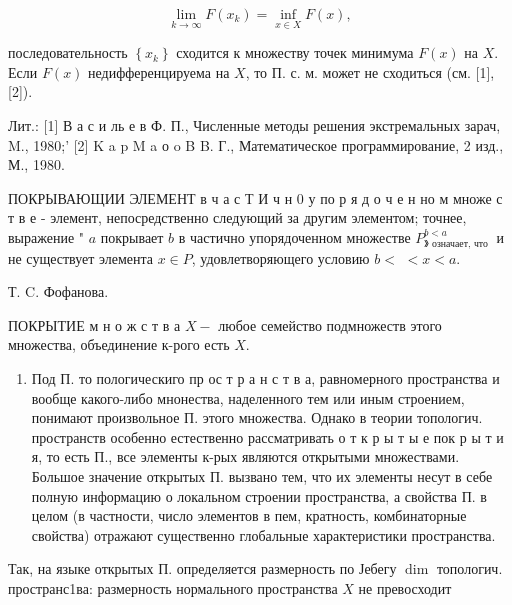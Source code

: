 \documentclass[10pt]{article}
\begin{document}
\[

\lim _{k \rightarrow \infty} F\left(x_{k}\right)=\inf _{x \in X} F(x),

\]



последовательность $\left\{x_{k}\right\}$ сходится к множеству точек минимума $F(x)$ на $X$. Если $F(x)$ недифференцируема на $X$, то П. с. м. может не сходиться (см. [1], [2]).



Лит.: [1] В а с и ль е в Ф. П., Численные методы решения экстремальных зарач, M., 1980;' [2] K a p M a о o B B. Г., Математическое программирование, 2 изд., М., 1980.



ПОКРЫВАЮЩИИ ЭЛЕМЕНТ в ч а с Т И ч н 0 у по р я д о ч е н но м множе с т в е - элемент, непосредственно следующий за другим элементом; точнее, выражение " $a$ покрывает $b$ в частично упорядоченном множестве $P_{\text {》 означает, что }}^{b<a}$ и не существует элемента $x \in P$, удовлетворяющего условию $b<$ $<x<a$.



Т. C. Фофанова.



ПОКРЫТИЕ м н о ж с т в а $X-$ любое семейство подмножеств этого множества, объединение к-рого есть $X$.



\begin{enumerate}

  \item Под П. то пологическиго пр ос т р а н с т в а, равномерного пространства и вообще какого-либо мнонества, наделенного тем или иным строением, понимают произвольное П. этого множества. Однако в теории топологич. пространств особенно естественно рассматривать о т к р ы т ы е пок р ы т и я, то есть П., все элементы к-рых являются открытыми множествами. Большое значение открытых П. вызвано тем, что их элементы несут в себе полную информацию о локальном строении пространства, а свойства П. в целом (в частности, число элементов в пем, кратность, комбинаторные свойства) отражают существенно глобальные характеристики пространства.

\end{enumerate}



Так, на языке открытых П. определяется размерность по Јебегу $\operatorname{dim}$ топологич. пространс1ва: размерность нормального пространства $X$ не превосходит
\end{document}
